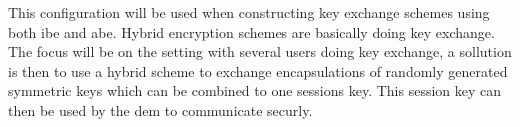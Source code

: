 This configuration will be used when constructing key exchange schemes using both \gls{ibe} and \gls{abe}. Hybrid encryption schemes are basically doing key exchange. The focus will be on the setting with several users doing key exchange, a sollution is then to use a hybrid scheme to exchange encapsulations of randomly generated symmetric keys which can be combined to one sessions key. This session key can then be used by the \gls{dem} to communicate securly.





